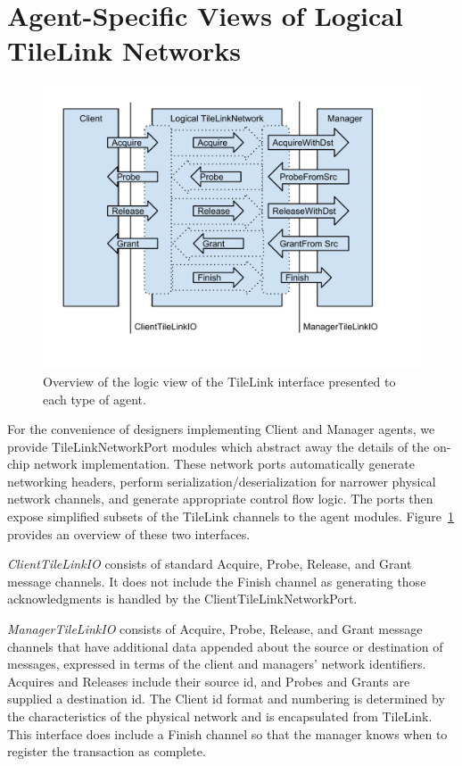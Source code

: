\section{Agent-Specific Views of Logical TileLink Networks}

\begin{figure}[p]
\centering
\includegraphics[width=1\columnwidth]{tilelink/figures/agent-specific.pdf}
\caption{Overview of the logic view of the TileLink interface presented to each type of agent.}
\label{fig:agent}
\end{figure}

For the convenience of designers implementing Client and Manager agents, we provide TileLinkNetworkPort modules which abstract away the details of the on-chip network implementation.
These network ports automatically generate networking headers, perform serialization/deserialization for narrower physical network channels, and generate appropriate control flow logic.
The ports then expose simplified subsets of the TileLink channels to the agent modules.
Figure~\ref{fig:agent} provides an overview of these two interfaces.

{\em ClientTileLinkIO} consists of standard Acquire, Probe, Release, and Grant message channels.
It does not include the Finish channel as generating those acknowledgments is handled by the ClientTileLinkNetworkPort.

{\em ManagerTileLinkIO} consists of Acquire, Probe, Release, and Grant message channels that have additional data appended about the source or destination of messages, expressed in terms of the client and managers' network identifiers.
Acquires and Releases include their source id, and Probes and Grants are supplied a destination id.
The Client id format and numbering is determined by the characteristics of the physical network and is encapsulated from TileLink.
This interface does include a Finish channel so that the manager knows when to register the transaction as complete.


